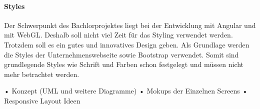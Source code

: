 \paragraph{Styles}Der Schwerpunkt des Bachlorprojektes liegt bei der Entwicklung mit Angular und mit WebGL. Deshalb soll nicht viel Zeit für das Styling verwendet werden. Trotzdem soll es ein gutes und innovatives Design geben. Als Grundlage werden die Styles der Unternehmenswebseite sowie Bootstrap verwendet. Somit sind grundlegende Styles wie Schrift und Farben schon festgelegt und müssen nicht mehr betrachtet werden.



• Konzept (UML und weitere Diagramme)
• Mokups der Einzelnen Screens
• Responsive Layout Ideen \\
%